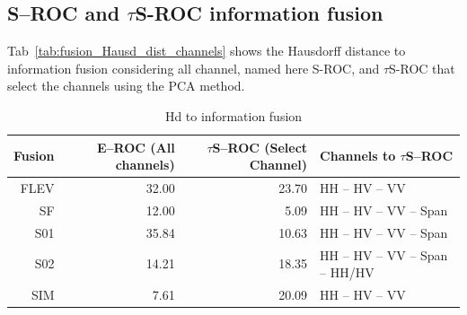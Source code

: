 \documentclass[remotesensing,article,submit,pdftex,moreauthors]{Definitions/mdpi}
\begin{document}
\subsection{S--ROC and \texorpdfstring{$\tau$S}--ROC information fusion}
Tab~\eqref{tab:fusion_Hausd_dist_channels} shows the Hausdorff distance to information fusion considering all channel, named here S-ROC, and $\tau$S-ROC that select the channels using the PCA method.
\begin{table}[hbt!]
	\centering
	\caption{Hd to information fusion}\label{tab:fusion_Hausd_dist_channels}
	\begin{tabular}{@{}rrrl@{}} \toprule
		 Fusion      & E--ROC (All channels)  & $\tau$S--ROC (Select Channel) & Channels to $\tau$S--ROC  \\ \midrule
	      FLEV       & 32.00  & 23.70 & HH -- HV -- VV \\
          SF         & 12.00  &  5.09 & HH -- HV -- VV -- Span \\
          S01        & 35.84  & 10.63 & HH -- HV -- VV -- Span  \\
          S02        & 14.21  & 18.35 & HH -- HV -- VV -- Span -- HH/HV \\
          SIM        &  7.61  & 20.09 & HH -- HV -- VV   \\
  \bottomrule
	\end{tabular}
\end{table}
\end{document}
